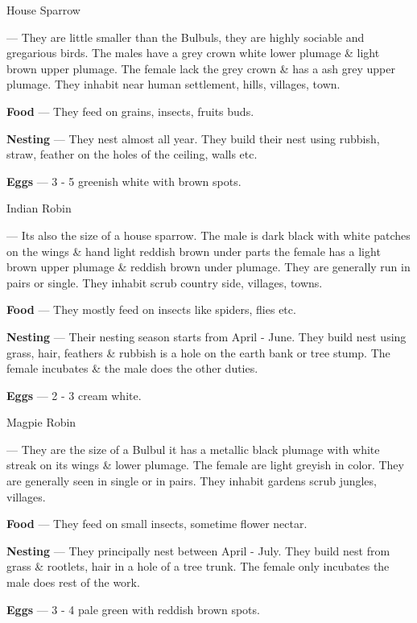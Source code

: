 \begin{bird}{House Sparrow}

 --- They are little smaller than the Bulbuls, they are highly sociable and gregarious birds. The males have a grey crown white lower plumage \& light brown upper plumage. The female lack the grey crown \& has a ash grey upper plumage. They inhabit near human settlement, hills, villages, town. 

{\large\bf Food} --- They feed on grains, insects, fruits buds.

{\large\bf Nesting} --- They nest almost all year. They build their nest using rubbish, straw, feather on the holes of the ceiling, walls etc.

{\large\bf Eggs} --- 3 - 5 greenish white with brown spots.
\end{bird}

\begin{bird}{Indian Robin}

 --- Its also the size of a house sparrow. The male is dark black with white patches on the wings \& hand light reddish brown under parts the female has a light brown upper plumage \& reddish brown under plumage. They are generally run in pairs or single. They inhabit scrub country side, villages, towns.

{\large\bf Food} --- They mostly feed on insects like spiders, flies etc.

{\large\bf Nesting} --- Their nesting season starts from April - June. They build nest using grass, hair, feathers  \& rubbish is a hole on the earth bank or tree stump. The female incubates \& the male does the other duties.

{\large\bf Eggs} --- 2 - 3 cream white.
\end{bird}

\begin{bird}{Magpie Robin}

 --- They are the size of a Bulbul it has a metallic black plumage with white streak on its wings \& lower plumage. The female are light greyish in color. They are generally seen in single or in pairs. They inhabit gardens scrub jungles, villages.

{\large\bf Food} --- They feed on small insects, sometime flower nectar.

{\large\bf Nesting} --- They principally nest between April - July. They build nest from grass \& rootlets, hair in a hole of a tree trunk. The female only incubates the male does rest of the work.

{\large\bf Eggs} --- 3 - 4 pale green with reddish brown spots.
\end{bird}

